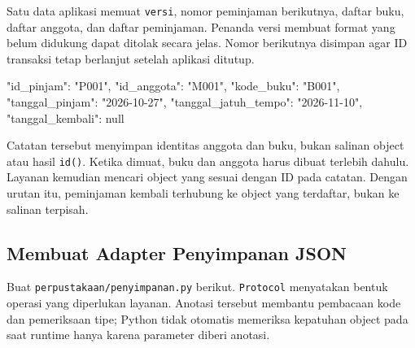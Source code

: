 Satu data aplikasi memuat \texttt{versi}, nomor peminjaman berikutnya, daftar buku, daftar anggota, dan daftar peminjaman. Penanda versi membuat format yang belum didukung dapat ditolak secara jelas. Nomor berikutnya disimpan agar ID transaksi tetap berlanjut setelah aplikasi ditutup.

\begin{keluaran}
{
  "id_pinjam": "P001",
  "id_anggota": "M001",
  "kode_buku": "B001",
  "tanggal_pinjam": "2026-10-27",
  "tanggal_jatuh_tempo": "2026-11-10",
  "tanggal_kembali": null
}
\end{keluaran}

Catatan tersebut menyimpan identitas anggota dan buku, bukan salinan object atau hasil \texttt{id()}. Ketika dimuat, buku dan anggota harus dibuat terlebih dahulu. Layanan kemudian mencari object yang sesuai dengan ID pada catatan. Dengan urutan itu, peminjaman kembali terhubung ke object yang terdaftar, bukan ke salinan terpisah.

\subsection{Membuat Adapter Penyimpanan JSON}

Buat \texttt{perpustakaan/penyimpanan.py} berikut. \texttt{Protocol} menyatakan bentuk operasi yang diperlukan layanan. Anotasi tersebut membantu pembacaan kode dan pemeriksaan tipe; Python tidak otomatis memeriksa kepatuhan object pada saat runtime hanya karena parameter diberi anotasi.

